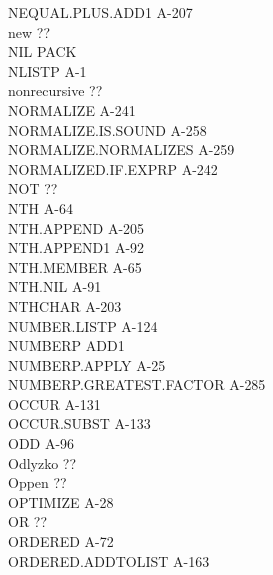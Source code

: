 \documentclass[10pt]{book}
\newenvironment{pubasis}{\begin{flushleft}}{\end{flushleft}}
\begin{document}
\begin{pubasis}
NEQUAL.PLUS.ADD1                             A-207\\
new                                          ??\\
NIL                                          PACK\\
NLISTP                                       A-1\\
nonrecursive                                 ??\\
NORMALIZE                                    A-241\\
NORMALIZE.IS.SOUND                           A-258\\
NORMALIZE.NORMALIZES                         A-259\\
NORMALIZED.IF.EXPRP                          A-242\\
NOT                                          ??\\
NTH                                          A-64\\
NTH.APPEND                                   A-205\\
NTH.APPEND1                                  A-92\\
NTH.MEMBER                                   A-65\\
NTH.NIL                                      A-91\\
NTHCHAR                                      A-203\\
NUMBER.LISTP                                 A-124\\
NUMBERP                                      ADD1\\
NUMBERP.APPLY                                A-25\\
NUMBERP.GREATEST.FACTOR                      A-285\\
OCCUR                                        A-131\\
OCCUR.SUBST                                  A-133\\
ODD                                          A-96\\
Odlyzko                                      ??\\
Oppen                                        ??\\
OPTIMIZE                                     A-28\\
OR                                           ??\\
ORDERED                                      A-72\\
ORDERED.ADDTOLIST                            A-163\\

\end{pubasis}
\end{document}
